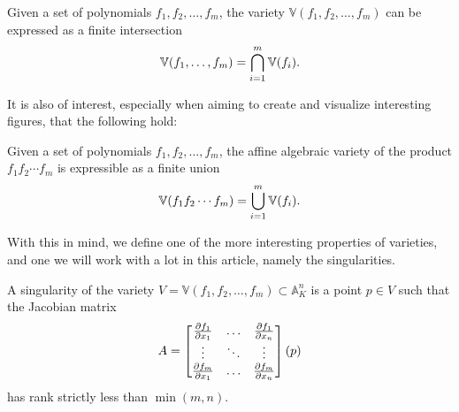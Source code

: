 \documentclass{article}
\newcommand{\A}{\ensuremath{\mathbb{A}}}
\newcommand{\V}{\ensuremath{\mathbb{V}}}
\begin{document}
    \begin{corollary}
        Given a set of polynomials $f_1, f_2, \ldots, f_m$, the variety
        $\V(f_1, f_2, \ldots, f_m)$ can be expressed as a finite intersection
        \begin{equation}
            \notag
            \V(f_1, \ldots, f_m) = \bigcap_{i=1}^{m} \V(f_i).
        \end{equation}
    \end{corollary}
    It is also of interest, especially when aiming to create and visualize
    interesting figures, that the following hold:
    \begin{corollary}
    Given a set of polynomials $f_1, f_2, \ldots, f_m$, the affine algebraic
    variety of the product $f_1f_2\cdots f_m$ is expressible as a finite union
    \begin{equation}
        \notag
        \V(f_1f_2\cdots f_m) = \bigcup_{i=1}^{m} \V(f_i).
    \end{equation}
    \end{corollary}
    
    With this in mind, we define one of the more interesting properties of
    varieties, and one we will work with a lot in this article, namely the
    singularities.
    \begin{definition}
        A singularity of the variety $V = \V(f_1, f_2, \ldots, f_m) \subset
        \A_K^n$ is a point $p \in V$ such that the Jacobian matrix
        \begin{equation}
            \notag
            A = \begin{bmatrix}
                \frac{\partial f_1}{\partial x_1} & \hdots & \frac{\partial f_1}{\partial x_n} \\
                \vdots & \ddots & \vdots \\
                \frac{\partial f_m}{\partial x_1} & \hdots & \frac{\partial f_m}{\partial x_n}
            \end{bmatrix}(p)
        \end{equation}
        has rank strictly less than $\min(m, n)$.
    \end{definition}
\end{document}
